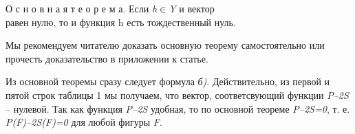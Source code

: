 \documentclass[main.tex]{subfiles}
\begin{document}
\begin{multicols}{2}
О с н о в н а я  т е о р е м а. $\textit{Если}$ \textit{h}$\in$\textit{Y} $\textit{и вектор}$  $\textit{равен нулю, то и функция h есть тождественный нуль}$. 

Мы рекомендуем читателю доказать основную теорему самостоятельно или прочесть доказательство в приложении к статье.

Из основной теоремы сразу следует формула \textit{б)}. Действительно, из первой и пятой строк таблицы 1 мы получаем, что вектор, соответсвующий функции \textit{P–2S} – нулевой. Так как функция \textit{P–2S} удобная, то по основной теореме \textit{P–2S=0}, т. е. \textit{P(F)–2S(F)=0} для любой фигуры \textit{F}. 

\end{multicols}
\end{document}
